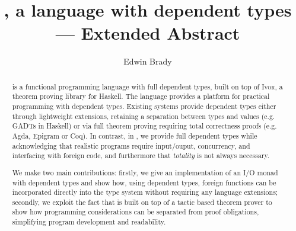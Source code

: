 \documentclass{llncs}
\newcommand{\Ivor}{\textsc{Ivor}}
\begin{document}
\title{\Idris{}, a language with dependent types --- Extended Abstract}
\author{Edwin Brady}

 
\maketitle

\begin{abstract}
\Idris{} is a functional programming language with full dependent
types, built on top of \Ivor{}, a theorem proving library for
Haskell. The language provides a platform for practical programming
with dependent types. Existing systems provide dependent types
either through lightweight extensions, retaining a separation between
types and values (e.g. GADTs in Haskell) or via
full theorem proving requiring total correctness proofs (e.g. Agda,
Epigram or Coq). In contrast, in \Idris{}, we provide full dependent
types while acknowledging that realistic programs require input/ouput,
concurrency, and interfacing with foreign code, and furthermore that
\emph{totality} is not always necessary.

We make two main contributions: firstly, we give an implementation of
an I/O monad with dependent types and show how, using dependent types,
foreign functions can be incorporated directly into the type system
without requiring any language extensions; secondly, we exploit the
fact that \Idris{} is built on top of a tactic based theorem prover to
show how programming considerations can be separated from proof
obligations, simplifying program development and readability.


\end{abstract}









%





\newcommand{\Pair}{\TC{Pair}}
\newcommand{\MkPair}{\DC{MkPair}}






%

\end{document}
